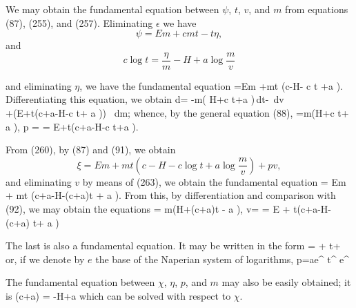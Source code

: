 \documentclass[12pt]{article}
\begin{document}
We may obtain the fundamental equation between $\psi$, $t$, $v$, and $m$ from equations (87), (255), and (257). Eliminating $\epsilon$ we have
$$\psi = Em + cmt - t\eta,$$
and                 $$c \log t =\frac{\eta}{m} -H + a \log \frac{m}{v}$$

and eliminating $\eta$, we have the fundamental equation
\eqs \psi =Em +mt \left(c-H- c \log t +a \log {}  \right). \label{260}\eqe
Differentiating this equation, we obtain
\eqs d\psi = -m\left( H+c \log t+a \log {}\right)\,dt-  \,dv\\
+\left(E+t\left(c+a-H-c \log t+ a \log {}\right)\right) \, dm; \label{261}\eqe
whence, by the general equation (88),
\eqs \eta=m\left(H+c \log t+ a \log {}\right), \label{262}\eqe
\eqs p =  \label{263}\eqe
\eqs \mu = E+t\left(c+a-H-c \log t+a \log {} \right).  \label{264}\eqe

From (260), by (87) and (91), we obtain
$$ \xi = E m + mt \left(c-H -c \log t+ a \log \frac{m}{v} \right) +pv,$$
and eliminating $v$ by means of (263), we obtain the fundamental equation
\eqs \xi = Em + mt \left(c+a-H-(c+a)\log t + a \log{} \right).  \label{265}\eqe
From this, by differentiation and comparison with (92), we may obtain the equations
\eqs \eta = m\left(H+(c+a)\log t - a \log {}\right),  \label{266}\eqe
\eqs v=       \label{267}\eqe
\eqs \mu = E + t\left(c+a-H-(c+a) \log t+ a \log {}\right)  \label{268}\eqe


The last is also a fundamental equation. It may be written in the form
\eqs \log{}=   +  \log t+  \label{269}\eqe
or, if we denote by $e$ the base of the Naperian system of logarithms,
\eqs 
p=ae^{} t^{} e^{} \label{270}\eqe


The fundamental equation between $\chi$, $\eta$, $p$, and $m$ may also be
easily obtained; it is
\eqs (c+a) \log {} =  -H+a \log {} \label{271}\eqe
which can be solved with respect to $\chi$.
\end{document}
